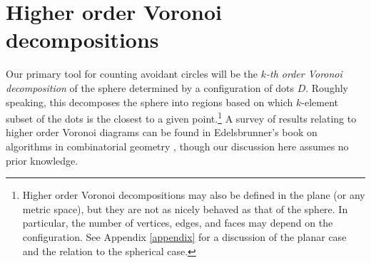 \documentclass[11pt,oneside]{amsart}
\newtheorem{lemma}[thm]{Lemma}
\theoremstyle{definition}
\theoremstyle{remark}
\newenvironment{defn}{\refstepcounter{thm}\begin{proof}[Definition \emph{\thethm}]\renewcommand*{\qedsymbol}{\(\blacksquare\)}}{\end{proof}}
\numberwithin{equation}{section}
\begin{document}





\section{Higher order Voronoi decompositions}\label{sec: higher Voronoi}

\def\dis{\operatorname{dist}}

Our primary tool for counting avoidant circles will be the \emph{$k$-th order Voronoi decomposition} of the sphere determined by a configuration of dots $D$. Roughly speaking, this decomposes the sphere into regions based on which $k$-element subset of the dots is the closest to a given point.\footnote{
Higher order Voronoi decompositions may also be defined in the plane (or any metric space), but they are not as nicely behaved as that of the sphere. In particular, the number of vertices, edges, and faces may depend on the configuration. See Appendix \ref{appendix} for a discussion of the planar case and the relation to the spherical case.
}  A survey of results relating to higher order Voronoi diagrams can be found in Edelsbrunner’s book on algorithms in combinatorial geometry \cite{EdelsbrunnerBook}, though our discussion here assumes no prior knowledge.


\end{document}
